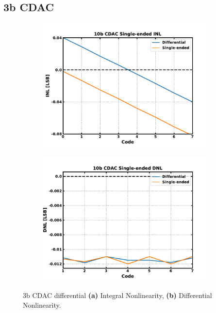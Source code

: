 \FloatBarrier\pagebreak
\subsection{3b CDAC}\label{sec:res_cdac_3b}

	\begin{figure}[htb!]
	    \centering
	    \begin{subfigure}{0.5\textwidth}
	        \centering
	        \includegraphics[width=1\textwidth, angle=0]{./figs/results/cdac_3b_inl}
	        \caption{ }
	        \label{fig:cdac_3b_inl}
	    \end{subfigure}%
	    \begin{subfigure}{0.5\textwidth}
	        \centering
	        \includegraphics[width=1\textwidth, angle=0]{./figs/results/cdac_3b_dnl}
	        \caption{ }
	        \label{fig:cdac_3b_dnl}
	    \end{subfigure}
	    \label{fig:3b_cdac_nonlinearity}
	    \caption{3b CDAC differential \textbf{(a)} Integral Nonlinearity, \textbf{(b)} Differential Nonlinearity.}
	\end{figure} 


